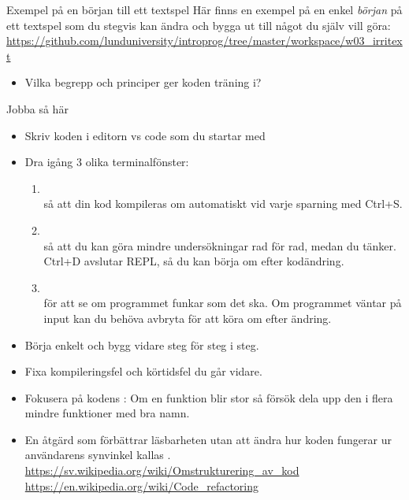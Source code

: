 \begin{SlideExtra}{Exempel på en början till ett textspel}
  Här finns en exempel på en enkel \emph{början} på ett textspel som du stegvis kan ändra och bygga ut till något du själv vill göra:
  \url{https://github.com/lunduniversity/introprog/tree/master/workspace/w03_irritext}

\begin{itemize}
  \item Vilka begrepp och principer ger koden träning i?
\end{itemize}

\end{SlideExtra}

\begin{SlideExtra}{Jobba så här}
\begin{itemize}\SlideFontTiny
  \item Skriv koden i editorn vs code som du startar med 
  \item Dra igång 3 olika terminalfönster:
  \begin{enumerate}\SlideFontTiny
  \item {}~\\så att din kod kompileras om automatiskt vid varje sparning med Ctrl+S.
  \item {}~\\så att du kan göra mindre undersökningar rad för rad, medan du tänker. Ctrl+D avslutar REPL, så du kan börja om efter kodändring.
  \item {}~\\för att se om programmet funkar som det ska. Om programmet väntar på input kan du behöva avbryta för att köra om efter ändring. 
  \end{enumerate}
  \item Börja enkelt och bygg vidare steg för steg i  steg.
  \item Fixa  kompileringsfel och  körtidsfel  du går vidare.
  \item Fokusera på kodens : Om en funktion blir stor så försök dela upp den i flera mindre funktioner med bra namn. 
  \item En åtgärd som förbättrar läsbarheten utan att ändra hur koden fungerar ur användarens synvinkel kallas  . \\\url{https://sv.wikipedia.org/wiki/Omstrukturering_av_kod}\\\url{https://en.wikipedia.org/wiki/Code_refactoring} 
\end{itemize}

\end{SlideExtra}

\fi
